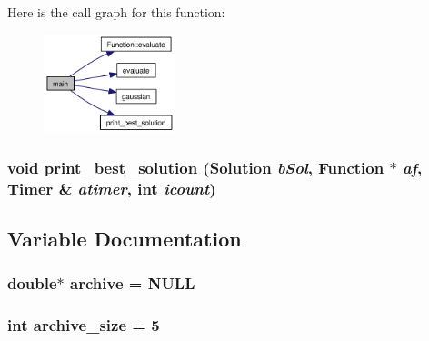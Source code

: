 Here is the call graph for this function:\nopagebreak
\begin{figure}[H]
\begin{center}
\leavevmode
\includegraphics[width=108pt]{aco-r_8cpp_3c04138a5bfe5d72780bb7e82a18e627_cgraph}
\end{center}
\end{figure}
\hypertarget{aco-r_8cpp_cec77708e3d6f73a14c252e8747c11b1}{
\subsubsection{\setlength{\rightskip}{0pt plus 5cm}void print\_\-best\_\-solution ({\bf Solution} {\em bSol}, \/  {\bf Function} $\ast$ {\em af}, \/  {\bf Timer} \& {\em atimer}, \/  int {\em icount})}}
\label{aco-r_8cpp_cec77708e3d6f73a14c252e8747c11b1}




\subsection{Variable Documentation}
\hypertarget{aco-r_8cpp_a0e91b6673e0f6c62ed362a35d18064e}{
\subsubsection{\setlength{\rightskip}{0pt plus 5cm}double$\ast$ {\bf archive} = NULL}}
\label{aco-r_8cpp_a0e91b6673e0f6c62ed362a35d18064e}


\hypertarget{aco-r_8cpp_ae8c272782ff802dd95092adf15f474e}{
\subsubsection{\setlength{\rightskip}{0pt plus 5cm}int {\bf archive\_\-size} = 5}}
\label{aco-r_8cpp_ae8c272782ff802dd95092adf15f474e}


